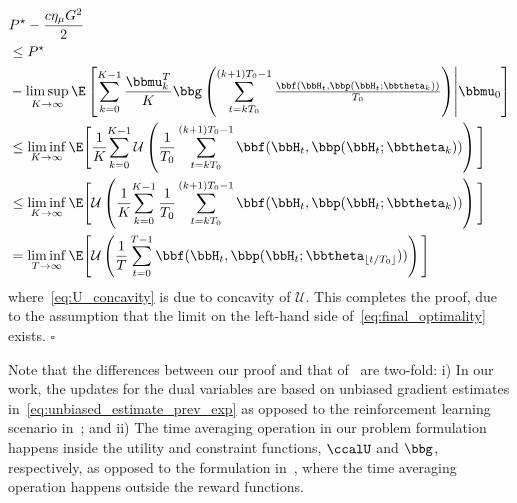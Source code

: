 \begin{align}
& P^{\star} - \frac{c\eta_{\mu}G^2}{2} \nonumber \\
&\leq P^{\star} \nonumber \\
& - \limsup_{K\to\infty} \E\left[\sum_{k=0}^{K-1} \frac{\bbmu_k^T}{K} \bbg\left(  \sum_{t=kT_0}^{(k+1)T_0-1} \tfrac{\bbf(\bbH_{t}, \bbp(\bbH_{t};\bbtheta_k))}{T_0} \right)\middle|\bbmu_0\right] \\
&\leq \liminf_{K\to\infty} \E\Bigg[\frac{1}{K}\hspace{-2pt} \sum_{k=0}^{K-1} \mathcal{U}\left( \frac{1}{T_0} \sum_{t=kT_0}^{(k+1)T_0-1} \bbf(\bbH_{t}, \bbp(\bbH_{t};\bbtheta_k)) \right) \Bigg] \\
&\leq \liminf_{K\to\infty} \E\Bigg[ \mathcal{U}\left( \frac{1}{K}\hspace{-2pt} \sum_{k=0}^{K-1} \frac{1}{T_0} \sum_{t=kT_0}^{(k+1)T_0-1} \bbf(\bbH_{t}, \bbp(\bbH_{t};\bbtheta_k)) \right) \Bigg] \label{eq:U_concavity}\\
&= \liminf_{T\to\infty} \E\Bigg[ \mathcal{U}\left( \frac{1}{T} \sum_{t=0}^{T-1} \bbf(\bbH_{t}, \bbp(\bbH_{t};\bbtheta_{\lfloor t / T_0 \rfloor})) \right) \Bigg] \label{eq:final_optimality}
\end{align}
where~\eqref{eq:U_concavity} is due to concavity of $\mathcal{U}$. This completes the proof, due to the assumption that the limit on the left-hand side of~\eqref{eq:final_optimality} exists.
\hfill$\square$

\begin{remark}\label{remark:proof_diff}
Note that the differences between our proof and that of~\cite{calvo2021state} are two-fold: i) In our work, the updates for the dual variables are based on unbiased gradient estimates in~\eqref{eq:unbiased_estimate_prev_exp} as opposed to the reinforcement learning scenario in~\cite{calvo2021state}; and ii) The time averaging operation in our problem formulation happens inside the utility and constraint functions, $\ccalU$ and $\bbg$, respectively, as opposed to the formulation in~\cite{calvo2021state}, where the time averaging operation happens outside the reward functions.
\end{remark}





